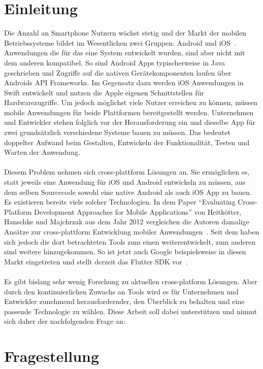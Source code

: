 \section*{Einleitung}

Die Anzahl an Smartphone Nutzern wächst stetig und der Markt der mobilen Betriebssysteme bildet im Wesentlichen zwei Gruppen: Android und iOS~\cite{statista}.
Anwendungen die für das eine System entwickelt wurden, sind aber nicht mit dem anderen kompatibel.
So sind Android Apps typischerweise in Java geschrieben und Zugriffe auf die nativen Gerätekomponenten laufen über Androids API Frameworks.
Im Gegensatz dazu werden iOS Anwendungen in Swift entwickelt und nutzen die Apple eigenen Schnittstellen für Hardwarezugriffe.
Um jedoch möglichst viele Nutzer erreichen zu können, müssen mobile Anwendungen für beide Plattformen bereitgestellt werden. Unternehmen und Entwickler stehen folglich vor der Herausforderung ein und dieselbe App für zwei grundsätzlich verschiedene Systeme bauen zu müssen.
Das bedeutet doppelter Aufwand beim Gestalten, Entwickeln der Funktionalität, Testen und Warten der Anwendung. \\ \\
Diesem Problem nehmen sich cross-plattform Lösungen an. Sie ermöglichen es, statt jeweils eine Anwendung für iOS und Android entwickeln zu müssen, aus dem selben Sourcecode sowohl eine native Android als auch iOS App zu bauen.
Es existieren bereits viele solcher Technologien. In dem Paper “Evaluating Cross-Platform Development Approaches for Mobile Applications” von Heitkötter, Hanschke und Majchrzak aus dem Jahr 2012 vergleichen die Autoren damalige Ansätze zur cross-plattform Entwicklung mobiler Anwendungen~\cite{eva12}.
Seit dem haben sich jedoch die dort betrachteten Tools zum einen weiterentwickelt, zum anderen sind weitere hinzugekommen. So ist jetzt auch Google beispielsweise in diesen Markt eingetreten und stellt derzeit das Flutter SDK vor~\cite{flutter}. \\ \\
Es gibt bislang sehr wenig Forschung zu aktuellen cross-platform Lösungen. Aber durch den kontinuierlichen Zuwachs an Tools wird es für Unternehmen und Entwickler zunehmend herausfordernder, den Überblick zu behalten und eine passende Technologie zu wählen. Diese Arbeit soll dabei unterstützen und nimmt sich daher der nachfolgenden Frage an:

\section*{Fragestellung}

